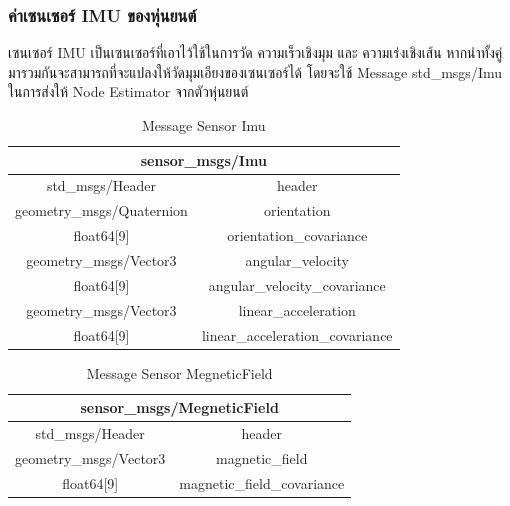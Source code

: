 \subsubsection*{ค่าเซนเซอร์ IMU ของหุ่นยนต์}
เซนเซอร์ IMU เป็นเซนเซอร์ที่เอาไว้ใช้ในการวัด ความเร็วเชิงมุม และ ความเร่งเชิงเส้น
หากนำทั้งคู่มารวมกันจะสามารถที่จะแปลงให้วัดมุมเอียงของเซนเซอร์ได้ โดยจะใช้ Message
std\_msgs/Imu ในการส่งให้ Node Estimator จากตัวหุ่นยนต์
\begin{table}[h!]
	\centering
	\begin{tabular}{| c | c |}
		\hline
		\multicolumn{2}{|c|}{sensor\_msgs/Imu}\\
		\hline
		std\_msgs/Header & header \\
		geometry\_msgs/Quaternion & orientation \\
		float64[9] & orientation\_covariance \\
		geometry\_msgs/Vector3 & angular\_velocity \\
		float64[9] & angular\_velocity\_covariance \\
		geometry\_msgs/Vector3 & linear\_acceleration \\
		float64[9] & linear\_acceleration\_covariance \\
		\hline
	\end{tabular}
	\caption{Message Sensor Imu}
	\label{tab:sensor_imu}
\end{table}
\begin{table}[h!]
	\centering
	\begin{tabular}{| c | c |}
		\hline
		\multicolumn{2}{|c|}{sensor\_msgs/MegneticField}\\
		\hline
		std\_msgs/Header & header \\
		geometry\_msgs/Vector3 & magnetic\_field \\
		float64[9] & magnetic\_field\_covariance \\
		\hline
	\end{tabular}
	\caption{Message Sensor MegneticField}
	\label{tab:sensor_megneticfield}
\end{table}
